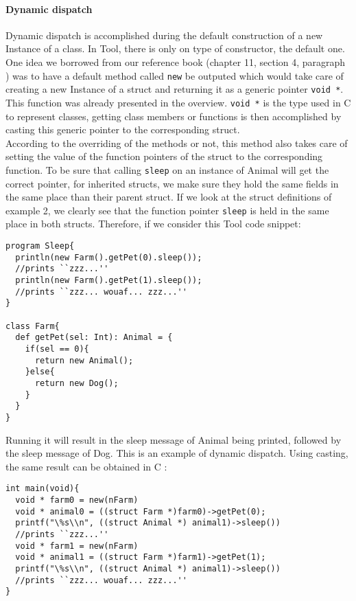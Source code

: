 \paragraph{Dynamic dispatch}
Dynamic dispatch is accomplished during the default construction of a new Instance of a class.
In Tool, there is only on type of constructor, the default one.
One idea we borrowed from our reference book\cite{oopBook} (chapter 11, section 4, paragraph )  was to have a default method called {\lstinline[basicstyle=\small\ttfamily]|new|} be outputed which would take care of creating a new Instance of a struct and returning it as a generic pointer {\lstinline[basicstyle=\small\ttfamily]|void *|}. This function was already presented in the overview. {\lstinline[basicstyle=\small\ttfamily]|void *|} is the type used in C to represent classes, getting class members or functions is then accomplished by casting this generic pointer to the corresponding struct.\\

According to the overriding of the methods or not, this method also takes care of setting the value of the function pointers of the struct to the corresponding function. To be sure that calling {\lstinline[basicstyle=\small\ttfamily]|sleep|} on an instance of Animal will get the correct pointer, for inherited structs, we make sure they hold the same fields in the same place than their parent struct. If we look at the struct definitions of example 2, we clearly see that the function pointer {\lstinline[basicstyle=\small\ttfamily]|sleep|} is held in the same place in both structs. Therefore, if we consider this Tool code snippet:

\lstset{style=customtool}
\begin{lstlisting}
program Sleep{
  println(new Farm().getPet(0).sleep());
  //prints ``zzz...''
  println(new Farm().getPet(1).sleep());
  //prints ``zzz... wouaf... zzz...''
}

class Farm{
  def getPet(sel: Int): Animal = {
    if(sel == 0){
      return new Animal();
    }else{
      return new Dog();
    }
  }
}
\end{lstlisting}
Running it will result in the sleep message of Animal being printed, followed by the sleep message of Dog. This is an example of dynamic dispatch. Using casting, the same result can be obtained in C :

\lstset{style=customc}
\begin{lstlisting}
int main(void){
  void * farm0 = new(nFarm)
  void * animal0 = ((struct Farm *)farm0)->getPet(0);
  printf("\%s\\n", ((struct Animal *) animal1)->sleep())
  //prints ``zzz...''
  void * farm1 = new(nFarm)
  void * animal1 = ((struct Farm *)farm1)->getPet(1);
  printf("\%s\\n", ((struct Animal *) animal1)->sleep())
  //prints ``zzz... wouaf... zzz...''
}
\end{lstlisting}

